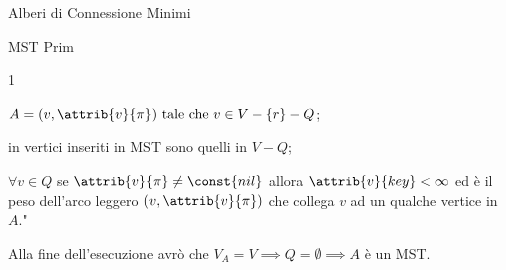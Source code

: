 \documentclass[8pt]{extarticle}
\begin{document}
\begin{formulario}
\begin{myParagraphEnd}{Alberi di Connessione Minimi}
\begin{subParagraph}{MST Prim}
\begin{descr} {1}
	\item[1)] $A={(v,\attrib{v}{\pi}) \text{ tale che } v\in V-\{r\}-Q}$;
	\item[2)] in vertici inseriti in MST sono quelli in $V-Q$;
	\item[3)] $\forall v\in Q$ se $\attrib{v}{\pi}\neq \const{nil}$ allora $\attrib{v}{key}<\infty$ ed è il peso dell'arco leggero $(v,\attrib{v}{\pi})$ che collega $v$ ad un qualche vertice in $A$."
\end{descr}
Alla fine dell'esecuzione avrò che $V_A=V\implies Q=\emptyset \implies A$ è un MST.
		\end{subParagraph}
	
	
	
	
	
	
	
	
	
	
	
	
	\end{myParagraphEnd}
\end{formulario}
\end{document}
